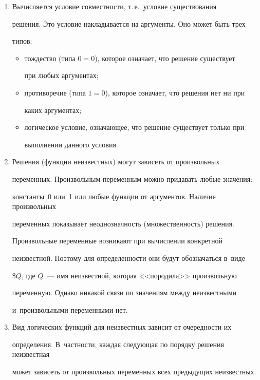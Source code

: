    \begin{enumerate}[1.]


   \item Вычисляется условие совместности, т.\,е.\ условие существования 


решения. Это условие накладывается на аргументы. Оно может быть трех 


типов:


   \begin{itemize}


   \item[(а)] тождество (типа $0 = 0$), которое означает, что решение существует 


при любых аргументах;


   \item[(б)] противоречие (типа $1 = 0$), которое означает, что решения нет ни при 


каких аргументах;


   \item[(в)] логическое условие, означающее, что решение существует только при 


выполнении данного условия.


   \end{itemize}


   \item Решения (функции неизвестных) могут зависеть от произвольных 


переменных. Произвольным переменным можно придавать любые значения: 


константы~0 или~1 или любые функции от аргументов. Наличие произвольных 


переменных показывает неоднозначность (множественность) решения. 


Произвольные переменные возникают при вычислении конкретной 


неизвестной. Поэтому для определенности они будут обозначаться в~виде  


\$$Q$, где $Q$~--- имя неизвестной, которая <<породила>> произвольную 


переменную. Однако никакой связи по значениям между неизвестными 


и~произвольными переменными нет.


   \item Вид логических функций для неизвестных зависит от очередности их 


определения. В~частности, каждая следующая по порядку решения неизвестная 


может зависеть от произвольных переменных всех предыдущих неизвестных.


   \end{enumerate}


